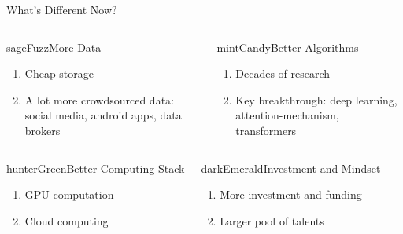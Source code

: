 \documentclass[aspectratio=169,xcolor=dvipsnames,svgnames,x11names,fleqn]{beamer}
\begin{document}
\begin{frame}{What's Different Now?}


\begin{columns}
    \begin{msgbox}{sageFuzz}{More Data}
        \begin{enumerate}
            \item Cheap storage
            \item  A lot more crowdsourced data: social media, android apps, data brokers
        \end{enumerate}
    \end{msgbox}

    \begin{msgbox}{mintCandy}{Better Algorithms}
        \begin{enumerate}
            \item Decades of research
            \item Key breakthrough: deep learning, attention-mechanism, transformers
        \end{enumerate}
    \end{msgbox}
\end{columns}

\begin{columns}
    \begin{msgbox}{hunterGreen}{Better Computing Stack}
        \begin{enumerate}
            \item GPU computation
            \item Cloud computing
        \end{enumerate}
    \end{msgbox}

    \begin{msgbox}{darkEmerald}{Investment and Mindset}
        \begin{enumerate}
            \item More investment and funding
            \item Larger pool of talents
        \end{enumerate}
    \end{msgbox}
\end{columns}

\end{frame}
\end{document}
